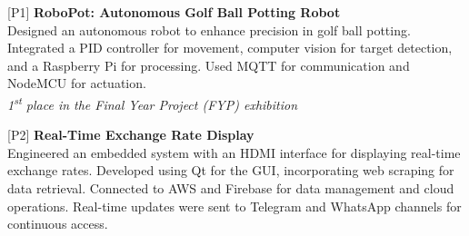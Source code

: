 

\begin{cventries}
\begin{rSection}{}
{\vspace{-0.5em}\hspace{-1.5em}[P1]\hspace{1em}\bodyfont\bfseries\color{darktext} {RoboPot: Autonomous Golf Ball Potting Robot \hspace{1em} \href{https://github.com/MortazaHassani/RoboPutter}{\Large{\faGithub}}}}
\\\hspace{1.2em}Designed an autonomous robot to enhance precision in golf ball potting. Integrated a PID controller for movement, computer vision for target detection, and a Raspberry Pi for processing. Used MQTT for communication and NodeMCU for actuation.
\\  \hspace{0.5em} \emph{1\textsuperscript{st} place in the Final Year Project (FYP) exhibition}
\vspace{-0.2em}
\end{rSection}

\begin{rSection}{}
{\hspace{-1.5em}[P2]\hspace{1em}}{\bodyfont\bfseries\color{darktext} {Real-Time Exchange Rate Display \hspace{1em} \href{https://www.linkedin.com/posts/mortazahassani_currency-rates-board-uml-and-images-activity-7166390758810312704-n4Oi} {\Large{\faLaptop}}}}
\\\hspace{1.2em}Engineered an embedded system with an HDMI interface for displaying real-time exchange rates. Developed using Qt for the GUI, incorporating web scraping for data retrieval. Connected to AWS and Firebase for data management and cloud operations. Real-time updates were sent to Telegram and WhatsApp channels for continuous access.
\vspace{-0.2em}
\end{rSection}


\end{cventries}
